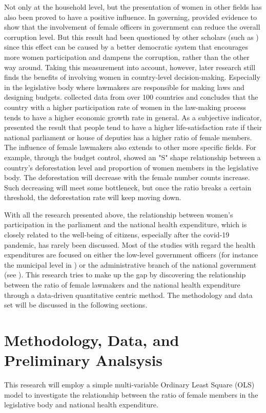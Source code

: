 \documentclass[12pt]{article}
\begin{document}
Not only at the household level, but the presentation of women in other fields has also been proved to have a positive influence.
In governing,  provided evidence to show that the involvement of female officers in government can reduce the overall corruption level.
But this result had been questioned by other scholars (such as ) since this effect can be caused by a better democratic system that encourages more women participation and dampens the corruption, rather than the other way around. 
Taking this measurement into account, however, later research still finds the benefits of involving women in country-level decision-making.
Especially in the legislative body where lawmakers are responsible for making laws and designing budgets.
 collected data from over 100 countries and concludes that the country with a higher participation rate of women in the law-making process tends to have a higher economic growth rate in general.
As a subjective indicator,  presented the result that people tend to have a higher life-satisfaction rate if their national parliament or house of deputies has a higher ratio of female members.  
The influence of female lawmakers also extends to other more specific fields.
For example, through the budget control,  showed an "S" shape relationship between a country's deforestation level and proportion of women members in the legislative body. 
The deforestation will decrease with the female number counts increase.
Such decreasing will meet some bottleneck, but once the ratio breaks a certain threshold, the deforestation rate will keep moving down.

With all the research presented above, the relationship between women's participation in the parliament and the national health expenditure, which is closely related to the well-being of citizens, especially after the covid-19 pandemic, has rarely been discussed. 
Most of the studies with regard the health expenditures are focused on either the low-level government officers (for instance the municipal level in ) or the administrative branch of the national government (see ).
This research tries to make up the gap by discovering the relationship between the ratio of female lawmakers and the national health expenditure through a data-driven quantitative centric method.
The methodology and data set will be discussed in the following sections.


\section{Methodology, Data, and Preliminary Analsysis}
This research will employ a simple multi-variable Ordinary Least Square (OLS) model to investigate the relationship between the ratio of female members in the legislative body and national health expenditure.
\end{document}
